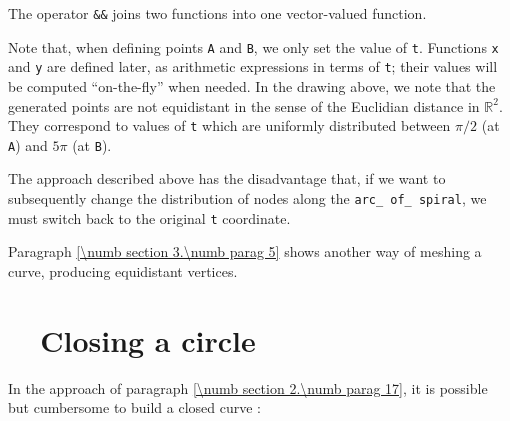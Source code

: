 The operator {\small\tt \&\&} joins two functions into one vector-valued function.

Note that, when defining points {\small\tt A} and {\small\tt B}, we only set the value of
{\small\tt t}.
Functions {\small\tt x} and {\small\tt y} are defined later, as arithmetic expressions in terms of
{\small\tt t}; their values will be computed ``on-the-fly'' when needed.
In the drawing above, we note that the generated points are not equidistant in the sense of the
Euclidian distance in $ \mathbb{R}^2 $.
They correspond to values of {\small\tt t} which are uniformly distributed between
$ \pi/2 $ (at {\small\tt A}) and $ 5\pi $ (at {\small\tt B}).

The approach described above has the disadvantage that, if we want to subsequently change the
distribution of nodes along the {\small\tt arc\_\,of\_\,spiral}, we must switch back to the original
{\small\tt t} coordinate.

Paragraph \ref{\numb section 3.\numb parag 5} shows another way of meshing a curve,
producing equidistant vertices.


\section{~~Closing a circle}\label{\numb section 2.\numb parag 18}

In the approach of paragraph \ref{\numb section 2.\numb parag 17}, it is possible but cumbersome to
build a closed curve :

